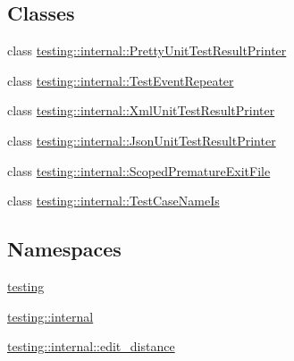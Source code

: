 \subsection*{Classes}
\begin{DoxyCompactItemize}
\item 
class \mbox{\hyperlink{classtesting_1_1internal_1_1_pretty_unit_test_result_printer}{testing\+::internal\+::\+Pretty\+Unit\+Test\+Result\+Printer}}
\item 
class \mbox{\hyperlink{classtesting_1_1internal_1_1_test_event_repeater}{testing\+::internal\+::\+Test\+Event\+Repeater}}
\item 
class \mbox{\hyperlink{classtesting_1_1internal_1_1_xml_unit_test_result_printer}{testing\+::internal\+::\+Xml\+Unit\+Test\+Result\+Printer}}
\item 
class \mbox{\hyperlink{classtesting_1_1internal_1_1_json_unit_test_result_printer}{testing\+::internal\+::\+Json\+Unit\+Test\+Result\+Printer}}
\item 
class \mbox{\hyperlink{classtesting_1_1internal_1_1_scoped_premature_exit_file}{testing\+::internal\+::\+Scoped\+Premature\+Exit\+File}}
\item 
class \mbox{\hyperlink{classtesting_1_1internal_1_1_test_case_name_is}{testing\+::internal\+::\+Test\+Case\+Name\+Is}}
\end{DoxyCompactItemize}
\subsection*{Namespaces}
\begin{DoxyCompactItemize}
\item 
 \mbox{\hyperlink{namespacetesting}{testing}}
\item 
 \mbox{\hyperlink{namespacetesting_1_1internal}{testing\+::internal}}
\item 
 \mbox{\hyperlink{namespacetesting_1_1internal_1_1edit__distance}{testing\+::internal\+::edit\+\_\+distance}}
\end{DoxyCompactItemize}
